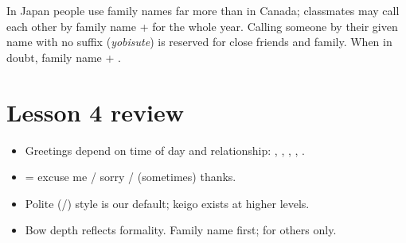 \begin{aside}
In Japan people use family names far more than in Canada; classmates may call each
other by family name +  for the whole year. Calling someone by their given name
with no suffix (\emph{yobisute}) is reserved for close friends and family. When in
doubt, family name + .
\end{aside}

\section*{Lesson 4 review}
\begin{itemize}
  \item Greetings depend on time of day and relationship: ,
        , , , .
  \item {} = excuse me / sorry / (sometimes) thanks.
  \item Polite (/) style is our default; keigo exists at higher levels.
  \item Bow depth reflects formality. Family name first;  for others only.
\end{itemize}
